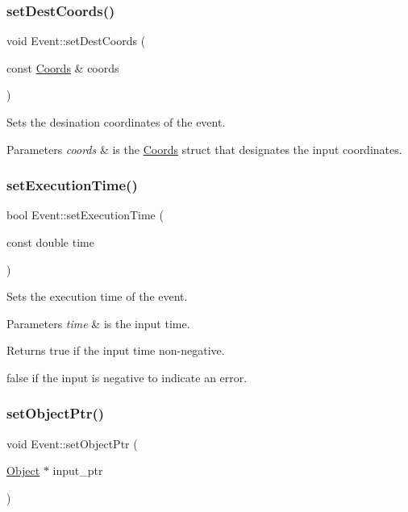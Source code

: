 \subsubsection{\texorpdfstring{set\+Dest\+Coords()}{setDestCoords()}}
{\footnotesize\ttfamily void Event\+::set\+Dest\+Coords (\begin{DoxyParamCaption}\item[{const \hyperlink{struct_coords}{Coords} \&}]{coords }\end{DoxyParamCaption})}



Sets the desination coordinates of the event. 


\begin{DoxyParams}{Parameters}
{\em coords} & is the \hyperlink{struct_coords}{Coords} struct that designates the input coordinates. \\
\hline
\end{DoxyParams}
\mbox{\label{class_event_af4282af20bd5b3940ba75c23e6032f18}} 
\subsubsection{\texorpdfstring{set\+Execution\+Time()}{setExecutionTime()}}
{\footnotesize\ttfamily bool Event\+::set\+Execution\+Time (\begin{DoxyParamCaption}\item[{const double}]{time }\end{DoxyParamCaption})}



Sets the execution time of the event. 


\begin{DoxyParams}{Parameters}
{\em time} & is the input time. \\
\hline
\end{DoxyParams}
\begin{DoxyReturn}{Returns}
true if the input time non-\/negative. 

false if the input is negative to indicate an error. 
\end{DoxyReturn}
\mbox{\label{class_event_a078cadde679fc042486ef065a097c7af}} 
\subsubsection{\texorpdfstring{set\+Object\+Ptr()}{setObjectPtr()}}
{\footnotesize\ttfamily void Event\+::set\+Object\+Ptr (\begin{DoxyParamCaption}\item[{\hyperlink{class_object}{Object} $\ast$}]{input\+\_\+ptr }\end{DoxyParamCaption})}



